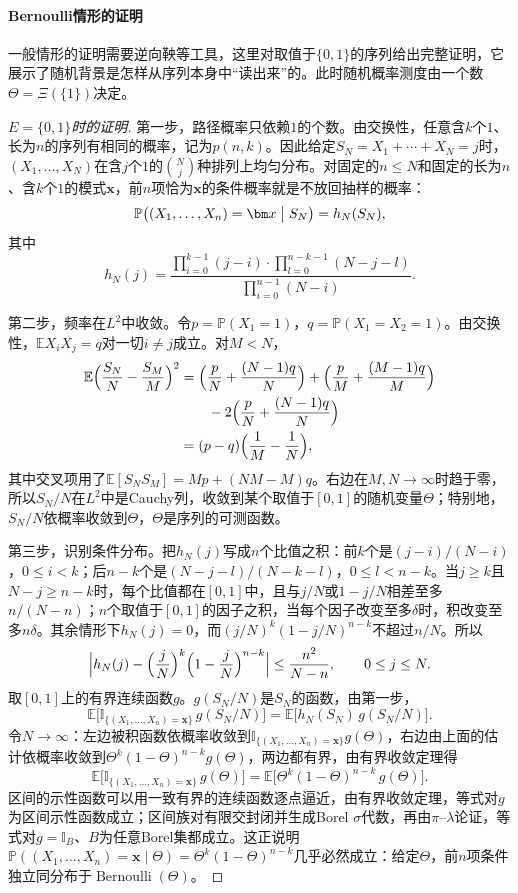 \paragraph{Bernoulli情形的证明}
一般情形的证明需要逆向鞅等工具，这里对取值于$\{0,1\}$的序列给出完整证明，它展示了随机背景是怎样从序列本身中“读出来”的。此时随机概率测度由一个数$\Theta=\Xi(\{1\})$决定。

\begin{proof}[$E=\{0,1\}$时的证明]
第一步，路径概率只依赖$1$的个数。由交换性，任意含$k$个$1$、长为$n$的序列有相同的概率，记为$p(n,k)$。因此给定$S_N=X_1+\cdots+X_N=j$时，$(X_1,\ldots,X_N)$在含$j$个$1$的$\binom Nj$种排列上均匀分布。对固定的$n\le N$和固定的长为$n$、含$k$个$1$的模式$\bm x$，前$n$项恰为$\bm x$的条件概率就是不放回抽样的概率：
\[
  \mathbb P\bigl((X_1,\ldots,X_n)=\bm x\bigm|S_N\bigr)=h_N(S_N),
\]
其中
\[
  h_N(j)=\frac{\prod_{i=0}^{k-1}(j-i)\cdot\prod_{l=0}^{n-k-1}(N-j-l)}{\prod_{i=0}^{n-1}(N-i)} .
\]

第二步，频率在$L^2$中收敛。令$p=\mathbb P(X_1=1)$，$q=\mathbb P(X_1=X_2=1)$。由交换性，$\mathbb EX_iX_j=q$对一切$i\ne j$成立。对$M<N$，
\[
  \begin{aligned}
  \mathbb E\Bigl(\frac{S_N}N-\frac{S_M}M\Bigr)^2
  &=\Bigl(\frac pN+\frac{(N-1)q}N\Bigr)+\Bigl(\frac pM+\frac{(M-1)q}M\Bigr)\\
  &\qquad-2\Bigl(\frac pN+\frac{(N-1)q}N\Bigr)\\
  &=(p-q)\Bigl(\frac1M-\frac1N\Bigr),
  \end{aligned}
\]
其中交叉项用了$\mathbb E[S_NS_M]=Mp+(NM-M)q$。右边在$M,N\to\infty$时趋于零，所以$S_N/N$在$L^2$中是Cauchy列，收敛到某个取值于$[0,1]$的随机变量$\Theta$；特别地，$S_N/N$依概率收敛到$\Theta$，$\Theta$是序列的可测函数。

第三步，识别条件分布。把$h_N(j)$写成$n$个比值之积：前$k$个是$(j-i)/(N-i)$，$0\le i<k$；后$n-k$个是$(N-j-l)/(N-k-l)$，$0\le l<n-k$。当$j\ge k$且$N-j\ge n-k$时，每个比值都在$[0,1]$中，且与$j/N$或$1-j/N$相差至多$n/(N-n)$；$n$个取值于$[0,1]$的因子之积，当每个因子改变至多$\delta$时，积改变至多$n\delta$。其余情形下$h_N(j)=0$，而$(j/N)^k(1-j/N)^{n-k}$不超过$n/N$。所以
\[
  \Bigl|h_N(j)-\Bigl(\frac jN\Bigr)^k\Bigl(1-\frac jN\Bigr)^{n-k}\Bigr|\le\frac{n^2}{N-n},\qquad 0\le j\le N .
\]
取$[0,1]$上的有界连续函数$g$。$g(S_N/N)$是$S_N$的函数，由第一步，
\[
  \mathbb E\bigl[\mathbb I_{\{(X_1,\ldots,X_n)=\bm x\}}\,g(S_N/N)\bigr]=\mathbb E\bigl[h_N(S_N)\,g(S_N/N)\bigr].
\]
令$N\to\infty$：左边被积函数依概率收敛到$\mathbb I_{\{(X_1,\ldots,X_n)=\bm x\}}g(\Theta)$，右边由上面的估计依概率收敛到$\Theta^k(1-\Theta)^{n-k}g(\Theta)$，两边都有界，由有界收敛定理得
\[
  \mathbb E\bigl[\mathbb I_{\{(X_1,\ldots,X_n)=\bm x\}}\,g(\Theta)\bigr]=\mathbb E\bigl[\Theta^k(1-\Theta)^{n-k}\,g(\Theta)\bigr].
\]
区间的示性函数可以用一致有界的连续函数逐点逼近，由有界收敛定理，等式对$g$为区间示性函数成立；区间族对有限交封闭并生成Borel $\sigma$代数，再由$\pi$--$\lambda$论证，等式对$g=\mathbb I_B$、$B$为任意Borel集都成立。这正说明$\mathbb P((X_1,\ldots,X_n)=\bm x\mid\Theta)=\Theta^k(1-\Theta)^{n-k}$几乎必然成立：给定$\Theta$，前$n$项条件独立同分布于$\operatorname{Bernoulli}(\Theta)$。


\end{proof}
